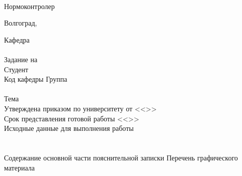 {    \vspace{\fill}\\
    Нормоконтролер 
    \hfill
    \\
    \vspace{\fill}
    \begin{center}
    Волгоград,~\the\year
    \end{center}
    \clearpage
    \setcounter{pageAtSecondTitle}{\thepage}
    \begin{center}
    \VSTUTitleHeading
    \end{center}
    Кафедра~\uline{\VSTUDepartment\hfill}\\
    \vfill
    \hfill\VSTUTitleHeadApproval
    \vspace{\fill}
    \\Задание на \\
    Студент \\
    Код кафедры \uline{\makebox[4cm]{\VSTUDepartmentCode}} \hfill Группа \uline{\makebox[4cm]{\VSTUStudentGroup}}\\
    \vspace{1mm}\\
    Тема \VSTUTitleUL\\
    Утверждена приказом по университету от <<\uline{\makebox[0.5cm]{\VSTUOrderDate}}>> \uline{\makebox[1.8cm]{\VSTUOrderMonth}} \uline{\makebox[1.2cm]{\VSTUOrderYear}} \textnumero\uline{\makebox[2cm]{\VSTUOrderNumber}}\\
    Срок представления готовой работы <<\uline{\makebox[0.5cm]{\VSTUDeadlineDate}}>> \uline{\makebox[2cm]{\VSTUDeadlineMonth}} \uline{\makebox[1.2cm]{\the\year}} \\
    Исходные данные для выполнения работы\\
    \VSTUInitialDataUL\\
    \vspace{4mm}\\
    Содержание основной части пояснительной записки
    {\small
    \VSTUPZContents
    }
    \noindent Перечень графического материала
    {\small
    \VSTUPZGraphics
    }
    \vspace{\fill}
}
